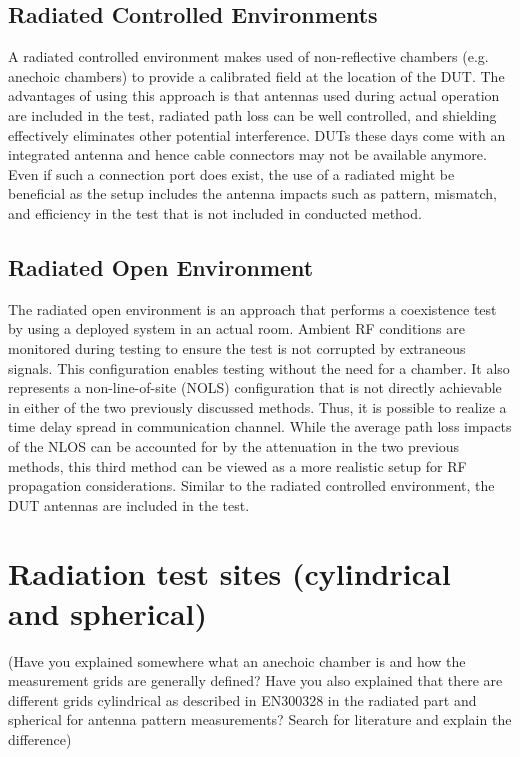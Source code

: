 \subsection{Radiated Controlled Environments}
A radiated controlled environment makes used of non-reflective chambers (e.g. anechoic chambers) to provide a calibrated field at the location of the DUT. The advantages of using this approach is that antennas used during actual operation are included in the test, radiated path loss can be well controlled, and shielding effectively eliminates other potential interference. DUTs these days come with an integrated antenna and hence cable connectors may not be available anymore. Even if such a connection port does exist, the use of a radiated might be beneficial as the setup includes the antenna impacts such as pattern, mismatch, and efficiency in the test that is not included in conducted method. 

\subsection{Radiated Open Environment}
The radiated open environment is an approach that performs a coexistence test by using a deployed system in an actual room. Ambient RF conditions are monitored during testing to ensure the test is not corrupted by extraneous signals. This configuration enables testing without the need for a chamber. It also represents a non-line-of-site (NOLS) configuration that is not directly achievable in either of the two previously discussed methods. Thus, it is possible to realize a time delay spread in communication channel. While the average path loss impacts of the NLOS can be accounted for by the attenuation in the two previous methods, this third method can be viewed as a more realistic setup for RF propagation considerations. Similar to the radiated controlled environment, the DUT antennas are included in the test. 



\section{Radiation test sites (cylindrical and spherical)}
(Have you explained somewhere what an anechoic chamber is and how the measurement grids are generally defined? Have you also explained that there are different grids cylindrical as described in EN300328 in the radiated part and spherical for antenna pattern measurements? Search for literature and explain the difference)




